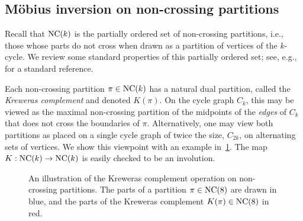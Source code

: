 \subsection{M{\"o}bius inversion on non-crossing partitions}

Recall that $\mathrm{NC}(k)$ is the partially ordered set of non-crossing partitions, i.e., those whose parts do not cross when drawn as a partition of vertices of the $k$-cycle.
We review some standard properties of this partially ordered set; see, e.g., \cite{NS-2006-LecturesCombinatoricsFreeProbability} for a standard reference.

Each non-crossing partition $\pi \in \mathrm{NC}(k)$ has a natural dual partition, called the \emph{Kreweras complement} and denoted $K(\pi)$.
On the cycle graph $C_k$, this may be viewed as the maximal non-crossing partition of the midpoints of the \emph{edges} of $C_k$ that does not cross the boundaries of $\pi$.
Alternatively, one may view both partitions as placed on a single cycle graph of twice the size, $C_{2k}$, on alternating sets of vertices.
We show this viewpoint with an example in~\cref{fig:kreweras}.
The map $K: \mathrm{NC}(k) \to \mathrm{NC}(k)$ is easily checked to be an involution.

\begin{figure}[!htbp]
\begin{center}
\end{center}
\caption{An illustration of the Kreweras complement operation on non-crossing partitions. The parts of a partition $\pi \in \mathrm{NC}(8)$ are drawn in blue, and the parts of the Kreweras complement $K(\pi) \in \mathrm{NC}(8)$ in red.}
\label{fig:kreweras}
\end{figure}


